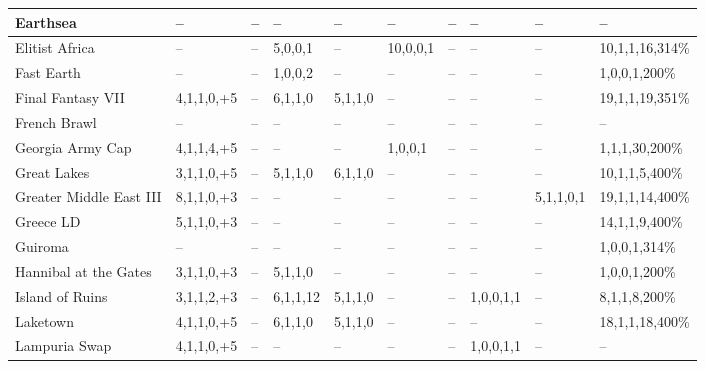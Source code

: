 \begin{longtable}{|p{1.8cm}|p{1cm}|p{0.8cm}|p{1cm}|p{1cm}|p{1cm}|p{1cm}|p{1.3cm}|p{1cm}|p{1.4cm}|}
Earthsea                  & –           & –                    & –         & –         & –   & –   & –               & –   & – \\ \hline
Elitist Africa            & –           & –                    & 5,0,0,1   & –         & 10,0,0,1 & – & –            & –   & 10,1,1,16,314\% \\ \hline
Fast Earth                & –           & –                    & 1,0,0,2   & –         & –   & –   & –               & –   & 1,0,0,1,200\% \\ \hline
Final Fantasy VII         & 4,1,1,0,+5  & –                    & 6,1,1,0   & 5,1,1,0   & –   & –   & –               & –   & 19,1,1,19,351\% \\ \hline
French Brawl              & –           & –                    & –         & –         & –   & –   & –               & –   & – \\ \hline
Georgia Army Cap          & 4,1,1,4,+5  & –                    & –         & –         & 1,0,0,1 & – & –               & –   & 1,1,1,30,200\% \\ \hline
Great Lakes               & 3,1,1,0,+5  & –                    & 5,1,1,0   & 6,1,1,0   & –   & –   & –               & –   & 10,1,1,5,400\% \\ \hline
Greater Middle East III   & 8,1,1,0,+3  & –                    & –         & –         & –   & –   & –               & 5,1,1,0,1 & 19,1,1,14,400\% \\ \hline
Greece LD                 & 5,1,1,0,+3  & –                    & –         & –         & –   & –   & –               & –   & 14,1,1,9,400\% \\ \hline
Guiroma                   & –           & –                    & –         & –         & –   & –   & –               & –   & 1,0,0,1,314\% \\ \hline
Hannibal at the Gates     & 3,1,1,0,+3  & –                    & 5,1,1,0   & –         & –   & –   & –               & –   & 1,0,0,1,200\% \\ \hline
Island of Ruins           & 3,1,1,2,+3  & –                    & 6,1,1,12  & 5,1,1,0   & –   & –   & 1,0,0,1,1       & –   & 8,1,1,8,200\% \\ \hline
Laketown                  & 4,1,1,0,+5  & –                    & 6,1,1,0   & 5,1,1,0   & –   & –   & –               & –   & 18,1,1,18,400\% \\ \hline
Lampuria Swap             & 4,1,1,0,+5  & –                    & –         & –         & –   & –   & 1,0,0,1,1       & –   & – \\ \hline

\end{longtable}
